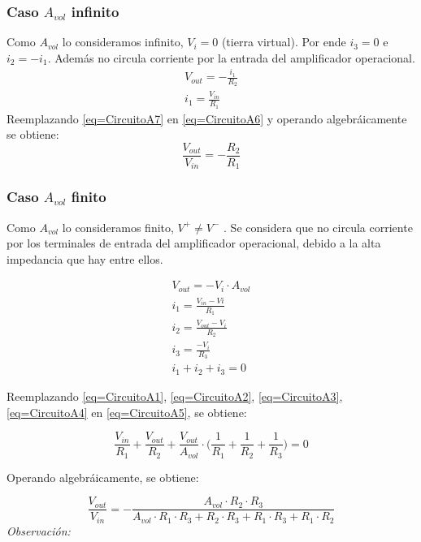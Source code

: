 \documentclass[../../main.tex]{subfiles}
\begin{document}
\subsubsection{Caso $A_{vol}$ infinito}

Como $A_{vol}$ lo consideramos infinito, $V_{i}=0$ (tierra virtual). Por ende $i_{3}=0$ e $i_{2}=-i_{1}$. Adem\'as no circula corriente por la entrada del amplificador operacional.
\begin{gather}
V_{out}=-\frac{i_{1}}{R_{2}}\label{eq=CircuitoA6}\\
i_{1}=\frac{V_{in}}{R_{1}}\label{eq=CircuitoA7}
\end{gather}
Reemplazando \ref{eq=CircuitoA7} en \ref{eq=CircuitoA6} y operando algebr\'aicamente se obtiene:
\begin{equation}
\frac{V_{out}}{V_{in}}= -\frac{R_{2}}{R_{1}} \label{eq=CircuitoAideal}
\end{equation}


\subsubsection{Caso $A_{vol}$ finito}

Como $A_{vol}$  lo consideramos finito, $V^{+}\neq V^{-}$ . Se considera que no circula corriente por  los terminales de entrada del amplificador operacional, debido a la alta impedancia que hay entre ellos.

\begin{gather}
V_{out}= -V_{i}\cdot A_{vol}\label{eq=CircuitoA1}\\
i_{1}=\frac{V_{in}-V{i}}{R_{1}}\label{eq=CircuitoA2}\\
i_{2}=\frac{V_{out}-V_{i}}{R_{2}}\label{eq=CircuitoA3}\\
i_{3}=\frac{-V_{i}}{R_{3}}\label{eq=CircuitoA4}\\
i_{1}+i_{2}+i_{3}=0\label{eq=CircuitoA5}
\end{gather}

Reemplazando \ref{eq=CircuitoA1}, \ref{eq=CircuitoA2}, \ref{eq=CircuitoA3}, \ref{eq=CircuitoA4} en \ref{eq=CircuitoA5}, se obtiene:


$$\frac{V_{in}}{R_{1}} + \frac{V_{out}}{R_{2}}+\frac{V_{out}}{A_{vol}}\cdot \bigg( \frac{1}{R_{1}} + \frac{1}{R_{2}} + \frac{1}{R_{3}} \bigg) = 0$$

Operando algebr\'aicamente, se obtiene:

\begin{equation}
\frac{V_{out}}{V_{in}}= - \frac{A_{vol} \cdot R_{2} \cdot R_{3}}{A_{vol}\cdot R_{1} \cdot R_{3} + R_{2} \cdot R_{3} +  R_{1} \cdot R_{3} + R_{1} \cdot R_{2} }\label{eq=gananciaAfinito}
\end{equation}
\textit{Observaci\'on:}
\end{document}
